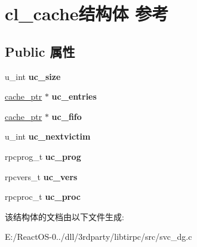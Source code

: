\hypertarget{structcl__cache}{}\section{cl\+\_\+cache结构体 参考}
\label{structcl__cache}
\subsection*{Public 属性}
\begin{DoxyCompactItemize}
\item 
\mbox{\label{structcl__cache_aaf7f411f49aa9d583e08beaec05c4634}} 
u\+\_\+int {\bfseries uc\+\_\+size}
\item 
\mbox{\label{structcl__cache_af3be01bcefa812c2e4b72cac481bb258}} 
\hyperlink{structcache__node}{cache\+\_\+ptr} $\ast$ {\bfseries uc\+\_\+entries}
\item 
\mbox{\label{structcl__cache_a78315f29a684f48712ec357919754aec}} 
\hyperlink{structcache__node}{cache\+\_\+ptr} $\ast$ {\bfseries uc\+\_\+fifo}
\item 
\mbox{\label{structcl__cache_ac3f6e2385b7ab1e9383e506e8d46f322}} 
u\+\_\+int {\bfseries uc\+\_\+nextvictim}
\item 
\mbox{\label{structcl__cache_a41c7ce2f2a473a58973fd42ca6d59a43}} 
rpcprog\+\_\+t {\bfseries uc\+\_\+prog}
\item 
\mbox{\label{structcl__cache_aaea805c41c5d936d60cebfa100e72ef4}} 
rpcvers\+\_\+t {\bfseries uc\+\_\+vers}
\item 
\mbox{\label{structcl__cache_aa98f564efad90d7a147df05212a25c09}} 
rpcproc\+\_\+t {\bfseries uc\+\_\+proc}
\end{DoxyCompactItemize}


该结构体的文档由以下文件生成\+:\begin{DoxyCompactItemize}
\item 
E\+:/\+React\+O\+S-\/0../dll/3rdparty/libtirpc/src/svc\+\_\+dg.\+c\end{DoxyCompactItemize}
